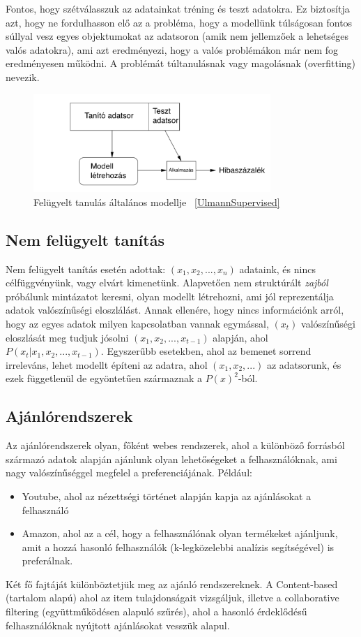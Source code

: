 \documentclass[a4paper,12pt]{article}
\begin{document}
Fontos, hogy szétválasszuk az adatainkat tréning és teszt adatokra. Ez biztosítja azt, hogy ne fordulhasson elő az a probléma, hogy a modellünk túlságosan fontos súllyal vesz egyes objektumokat az adatsoron (amik nem jellemzőek a lehetséges valós adatokra), ami azt eredményezi, hogy a valós problémákon már nem fog eredményesen működni. A problémát túltanulásnak vagy magolásnak (overfitting) nevezik. ~\cite{overfit}


\begin{figure}[ht!]
\centering
\includegraphics[width=90mm]{img/ml.png}
\caption{Felügyelt tanulás általános modellje ~\ref{UlmannSupervised} \label{ml}}
\end{figure}

\subsection{Nem felügyelt tanítás}
Nem felügyelt tanítás esetén adottak: $(x_1, x_2, ..., x_n)$ adataink, és nincs célfüggvényünk, vagy elvárt kimenetünk. Alapvetően nem struktúrált \textsl{zajból} próbálunk mintázatot keresni, olyan modellt létrehozni, ami jól reprezentálja adatok valószínűségi eloszlálást. Annak ellenére, hogy nincs információnk arról, hogy az egyes adatok milyen kapcsolatban vannak egymással, $(x_t)$ valószínűségi eloszlását meg tudjuk jósolni  $(x_1,x_2, ..., x_{t-1})$ alapján, ahol $P(x_t|x_1,x_2, ..., x_{t-1})$.
Egyszerűbb esetekben, ahol az bemenet sorrend irreleváns, lehet modellt építeni az adatra, ahol $(x_1, x_2, ...)$ az adatsorunk, és ezek függetlenül de egyöntetűen származnak a $P(x)^2$-ból.~\cite{unsupervised}

\subsection{Ajánlórendszerek}
Az ajánlórendszerek olyan, főként webes rendszerek, ahol a különböző forrásból származó adatok alapján ajánlunk olyan lehetőségeket a felhasználóknak, ami nagy valószínűséggel megfelel a preferenciájának. Például:
\begin{itemize}
\item Youtube, ahol az nézettségi történet alapján kapja az ajánlásokat a felhasználó
\item Amazon, ahol az a cél, hogy a felhasználónak olyan termékeket ajánljunk, amit a hozzá hasonló felhasználók (k-legközelebbi analízis segítségével) is preferálnak. ~\cite{knearest}
\end{itemize}
Két fő fajtáját különböztetjük meg az ajánló rendszereknek. A Content-based (tartalom alapú) ahol az item tulajdonságait vizsgáljuk, illetve a collaborative filtering (együttműködésen alapuló szűrés), ahol a hasonló érdeklődésű felhasználóknak nyújtott ajánlásokat vesszük alapul. \linebreak
\end{document}
